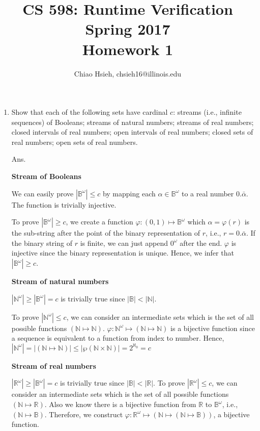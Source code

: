 \documentclass{article}
\title{\Large\bfseries CS 598: Runtime Verification \\
Spring 2017 \\
Homework 1}
\author{Chiao Hsieh, chsieh16@illinois.edu}
\begin{document}
\maketitle

\newcommand{\FinTraces}{\ensuremath{\Sigma^*}\xspace}
\newcommand{\InfTraces}{\ensuremath{\Sigma^\omega}\xspace}
\newcommand{\prefixes}{\ensuremath{\mathtt{prefixes}}\xspace}
\newcommand{\Nat}{\ensuremath{\mathbb{N}}\xspace}
\newcommand{\Real}{\ensuremath{\mathbb{R}}\xspace}
\newcommand{\Bool}{\ensuremath{\mathbb{B}}\xspace}


\begin{enumerate}
\item Show that each of the following sets have cardinal $c$: streams
(i.e., infinite sequences) of Booleans; streams of natural numbers;
streams of real numbers; closed intervals of real numbers;
open intervals of real numbers; closed sets of real numbers;
open sets of real numbers.

Ans.

\textbf{Stream of Booleans}

We can easily prove $|\Bool^\omega| \leq c$ by mapping
each $\alpha \in \Bool^\omega$ to a real number $0.\bar{\alpha}$.
The function is trivially injective.

To prove $|\Bool^\omega| \geq c$, we create a function
$\varphi : (0,1) \mapsto \Bool^\omega$ which $\alpha = \varphi(r)$ is
the sub-string after the point of the binary representation of $r$,
i.e., $r = 0.\bar{\alpha}$.
If the binary string of $r$ is finite,
we can just append $0^\omega$ after the end.
$\varphi$ is injective since the binary representation is unique.
Hence, we infer that $|\Bool^\omega| \geq c$.

\textbf{Stream of natural numbers}

$|\Nat^\omega|\geq|\Bool^\omega| = c$ is trivially true since $|\Bool|<|\Nat|$.

To prove $|\Nat^\omega| \leq c$, we can consider an intermediate sets which is
the set of all possible functions $(\Nat \mapsto \Nat)$.
$\varphi: \Nat^\omega \mapsto (\Nat \mapsto \Nat)$ is a bijective function since
a sequence is equivalent to a function from index to number.
Hence, $|\Nat^\omega| = |(\Nat\mapsto\Nat)| \leq |\wp(\Nat\times\Nat)| = 2^{\aleph_0} = c$

\textbf{Stream of real numbers}

$|\Real^\omega|\geq|\Bool^\omega| = c$ is trivially true since $|\Bool|<|\Real|$.
To prove $|\Real^\omega| \leq c$, we can consider an intermediate sets which is
the set of all possible functions $(\Nat \mapsto \Real)$.
Also we know there is a bijective function from \Real to $\Bool^\omega$,
i.e., $(\Nat \mapsto \Bool)$.
Therefore, we construct $\varphi: \Real^\omega \mapsto (\Nat \mapsto (\Nat \mapsto \Bool))$,
a bijective function.


\end{enumerate}
\end{document}
